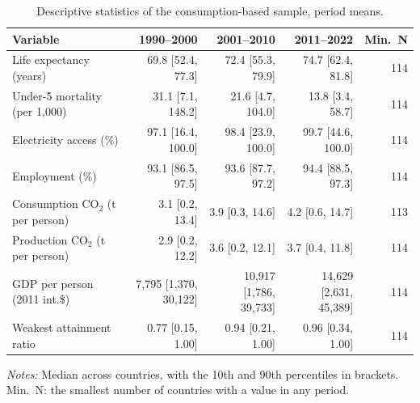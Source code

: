 \begin{table}[tbp]
\centering
\footnotesize
\setlength{\tabcolsep}{3pt}
\caption{Descriptive statistics of the consumption-based sample, period means.}
\label{tab:desc}
\begin{threeparttable}
\begin{tabular}{lrrrr}
\toprule
Variable & 1990–2000 & 2001–2010 & 2011–2022 & Min.\ N \\
\midrule
Life expectancy (years) & 69.8 [52.4, 77.3] & 72.4 [55.3, 79.9] & 74.7 [62.4, 81.8] & 114 \\
Under-5 mortality (per 1,000) & 31.1 [7.1, 148.2] & 21.6 [4.7, 104.0] & 13.8 [3.4, 58.7] & 114 \\
Electricity access (\%) & 97.1 [16.4, 100.0] & 98.4 [23.9, 100.0] & 99.7 [44.6, 100.0] & 114 \\
Employment (\%) & 93.1 [86.5, 97.5] & 93.6 [87.7, 97.2] & 94.4 [88.5, 97.3] & 114 \\
Consumption CO$_2$ (t per person) & 3.1 [0.2, 13.4] & 3.9 [0.3, 14.6] & 4.2 [0.6, 14.7] & 113 \\
Production CO$_2$ (t per person) & 2.9 [0.2, 12.2] & 3.6 [0.2, 12.1] & 3.7 [0.4, 11.8] & 114 \\
GDP per person (2011 int.\$) & 7{,}795 [1{,}370{,} 30{,}122] & 10{,}917 [1{,}786{,} 39{,}733] & 14{,}629 [2{,}631{,} 45{,}389] & 114 \\
Weakest attainment ratio & 0.77 [0.15, 1.00] & 0.94 [0.21, 1.00] & 0.96 [0.34, 1.00] & 114 \\
\bottomrule
\end{tabular}
\begin{tablenotes}[flushleft]
\footnotesize
\item \textit{Notes:} Median across countries, with the 10th and 90th percentiles in brackets. Min.\ N: the smallest number of countries with a value in any period.
\end{tablenotes}
\end{threeparttable}
\end{table}
